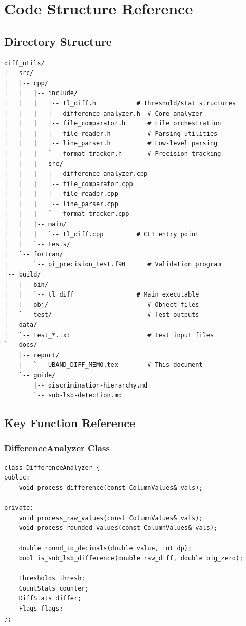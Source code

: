 \documentclass[11pt,letterpaper]{article}
\begin{document}
\section{Code Structure Reference}
\label{app:code}

\subsection{Directory Structure}

\begin{verbatim}
diff_utils/
|-- src/
|   |-- cpp/
|   |   |-- include/
|   |   |   |-- tl_diff.h           # Threshold/stat structures
|   |   |   |-- difference_analyzer.h  # Core analyzer
|   |   |   |-- file_comparator.h      # File orchestration
|   |   |   |-- file_reader.h          # Parsing utilities
|   |   |   |-- line_parser.h          # Low-level parsing
|   |   |   `-- format_tracker.h       # Precision tracking
|   |   |-- src/
|   |   |   |-- difference_analyzer.cpp
|   |   |   |-- file_comparator.cpp
|   |   |   |-- file_reader.cpp
|   |   |   |-- line_parser.cpp
|   |   |   `-- format_tracker.cpp
|   |   |-- main/
|   |   |   `-- tl_diff.cpp         # CLI entry point
|   |   `-- tests/
|   `-- fortran/
|       `-- pi_precision_test.f90      # Validation program
|-- build/
|   |-- bin/
|   |   `-- tl_diff                 # Main executable
|   |-- obj/                           # Object files
|   `-- test/                          # Test outputs
|-- data/
|   `-- test_*.txt                     # Test input files
`-- docs/
    |-- report/
    |   `-- UBAND_DIFF_MEMO.tex        # This document
    `-- guide/
        |-- discrimination-hierarchy.md
        `-- sub-lsb-detection.md
\end{verbatim}

\subsection{Key Function Reference}

\subsubsection{DifferenceAnalyzer Class}

\begin{verbatim}
class DifferenceAnalyzer {
public:
    void process_difference(const ColumnValues& vals);

private:
    void process_raw_values(const ColumnValues& vals);
    void process_rounded_values(const ColumnValues& vals);

    double round_to_decimals(double value, int dp);
    bool is_sub_lsb_difference(double raw_diff, double big_zero);

    Thresholds thresh;
    CountStats counter;
    DiffStats differ;
    Flags flags;
};
\end{verbatim}
\end{document}

